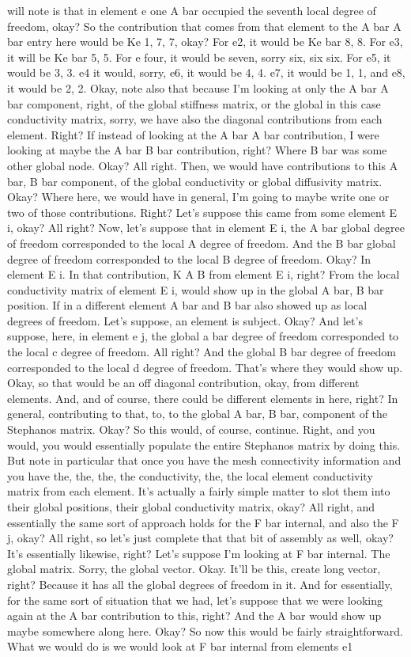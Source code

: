 \documentclass[10pt]{article}
\begin{document}
will note is that in element e one A bar occupied the seventh local degree of freedom, okay? So the contribution that comes from that element to the A bar A bar entry here would be Ke 1, 7, 7, okay? For e2, it would be Ke bar 8, 8. For e3, it will be Ke bar 5, 5. For e four, it would be seven, sorry six, six six. For e5, it would be 3, 3. e4 it would, sorry, e6, it would be 4, 4. e7, it would be 1, 1, and e8, it would be 2, 2. Okay, note also that because I'm looking at only the A bar A bar component, right, of the global stiffness matrix, or the global in this case conductivity matrix, sorry, we have also the diagonal contributions from each element. Right? If instead of looking at the A bar A bar contribution, I were looking at maybe the A bar B bar contribution, right? Where B bar was some other global node. Okay? All right. Then, we would have contributions to this A bar, B bar component, of the global conductivity or global diffusivity matrix. Okay? Where here, we would have in general, I'm going to maybe write one or two of those contributions. Right? Let's suppose this came from some element E i, okay? All right? Now, let's suppose that in element E i, the A bar global degree of freedom corresponded to the local A degree of freedom. And the B bar global degree of freedom corresponded to the local B degree of freedom. Okay? In element E i. In that contribution, K A B from element E i, right? From the local conductivity matrix of element E i, would show up in the global A bar, B bar position. If in a different element A bar and B bar also showed up as local degrees of freedom. Let's suppose, an element is subject. Okay? And let's suppose, here, in element e j, the global a bar degree of freedom corresponded to the local c degree of freedom. All right? And the global B bar degree of freedom corresponded to the local d degree of freedom. That's where they would show up. Okay, so that would be an off diagonal contribution, okay, from different elements. And, and of course, there could be different elements in here, right? In general, contributing to that, to, to the global A bar, B bar, component of the Stephanos matrix. Okay? So this would, of course, continue. Right, and you would, you would essentially populate the entire Stephanos matrix by doing this. But note in particular that once you have the mesh connectivity information and you have the, the, the, the conductivity, the, the local element conductivity matrix from each element. It's actually a fairly simple matter to slot them into their global positions, their global conductivity matrix, okay? All right, and essentially the same sort of approach holds for the F bar internal, and also the F j, okay? All right, so let's just complete that that bit of assembly as well, okay? It's essentially likewise, right? Let's suppose I'm looking at F bar internal. The global matrix. Sorry, the global vector. Okay. It'll be this, create long vector, right? Because it has all the global degrees of freedom in it. And for essentially, for the same sort of situation that we had, let's suppose that we were looking again at the A bar contribution to this, right? And the A bar would show up maybe somewhere along here. Okay? So now this would be fairly straightforward. What we would do is we would look at F bar internal from elements e1 
\end{document}
